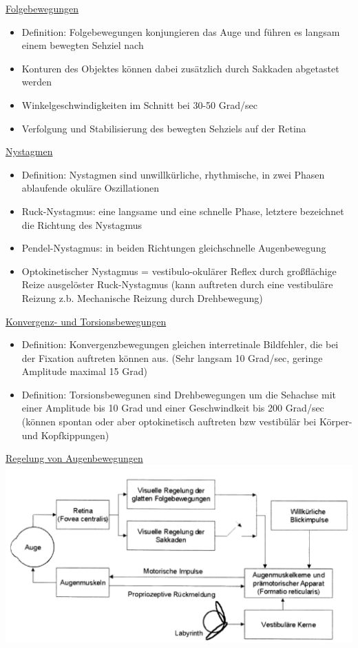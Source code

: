 \documentclass[a4paper,10pt,oneside]{article}
\begin{document}
\underline{Folgebewegungen} \\
	\begin{itemize}
		\item Definition: Folgebewegungen konjungieren das Auge und führen es langsam einem bewegten Sehziel nach
		\item Konturen des Objektes können dabei zusätzlich durch Sakkaden abgetastet werden
		\item Winkelgeschwindigkeiten im Schnitt bei 30-50 Grad/sec
		\item Verfolgung und Stabilisierung des bewegten Sehziels auf der Retina
	\end{itemize}
	
\underline{Nystagmen} \\
	\begin{itemize}
		\item Definition: Nystagmen sind unwillkürliche, rhythmische, in zwei Phasen ablaufende okuläre Oszillationen
		\item Ruck-Nystagmus: eine langsame und eine schnelle Phase, letztere bezeichnet die Richtung des Nystagmus
		\item Pendel-Nystagmus: in beiden Richtungen gleichschnelle Augenbewegung
		\item Optokinetischer Nystagmus = vestibulo-okulärer Reflex durch großflächige Reize ausgelöster Ruck-Nystagmus (kann auftreten durch eine vestibuläre Reizung z.b. Mechanische Reizung durch Drehbewegung)
	\end{itemize}
	
\underline{Konvergenz- und Torsionsbewegungen} \\
	\begin{itemize}
		\item Definition: Konvergenzbewegungen gleichen interretinale Bildfehler, die bei der Fixation auftreten können aus. (Sehr langsam 10 Grad/sec, geringe Amplitude maximal 15 Grad)
		\item Definition: Torsionsbewegunen sind Drehbewegungen um die Sehachse mit einer Amplitude bis 10 Grad und einer Geschwindkeit bis 200 Grad/sec (können spontan oder aber optokinetisch auftreten bzw vestibülär bei Körper- und Kopfkippungen)
	\end{itemize}
	
\underline{Regelung von Augenbewegungen} \\
\includegraphics[scale=0.2]{Grafiken/2027.png}
\end{document}
